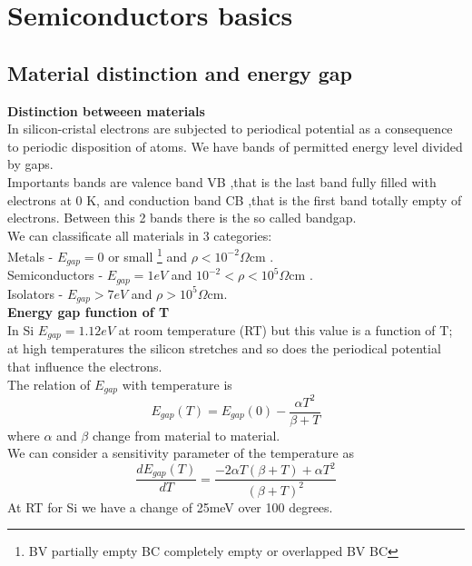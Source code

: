 \chapter{Semiconductors basics}
\section{Material distinction and energy gap}
{\bf Distinction betweeen materials}\\
In silicon-cristal electrons are subjected to periodical potential as a consequence to periodic disposition of atoms. We have bands of permitted energy level divided by gaps.\\
Importants bands are valence band VB ,that is the last band fully filled with electrons at 0 K, and conduction band CB ,that is the first band totally empty of electrons. Between this 2 bands there is the so called bandgap.\\
We can classificate all materials in 3 categories:\\
Metals           - $E_{gap}=0$ or small \footnote{BV partially empty BC completely empty or overlapped BV BC} and $\rho<10^{-2} \Omega$cm .\\ 
Semiconductors   - $E_{gap}=1eV$ and $10^{-2}<\rho<10^{5} \Omega$cm .\\
Isolators        - $E_{gap}>7eV$ and $\rho>10^{5} \Omega$cm.\\
\newline
{\bf Energy gap function of T}\\
In Si $E_{gap}=1.12eV$ at room temperature (RT) but this value is a function of T; at high temperatures the silicon stretches and so does the periodical potential that influence the electrons.\\ 
The relation of $E_{gap}$ with temperature is
\begin{equation}
E_{gap}(T)=E_{gap}(0)-\frac{\alpha T^2}{\beta + T}
\end{equation}
where $\alpha$ and $\beta$ change from material to material.\\
We can consider a sensitivity parameter of the temperature as 
\begin{equation}
\frac{dE_{gap}(T)}{dT}=\frac{-2\alpha T(\beta+T)+\alpha T^2}{(\beta + T)^2}
\end{equation}
At RT for Si we have a change of 25meV over 100 degrees.\\
\newline
